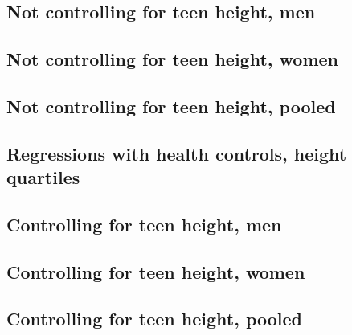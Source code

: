 \documentclass{article}
\begin{document}
\begin{landscape}
\subsection{Not controlling for teen height, men}

\end{landscape}

\begin{landscape}
\subsection{Not controlling for teen height, women}

\end{landscape}

\begin{landscape}
\subsection{Not controlling for teen height, pooled}

\end{landscape}

\begin{landscape}
\section{Regressions with health controls, height quartiles}
\subsection{Controlling for teen height, men}

\end{landscape}

\begin{landscape}
\subsection{Controlling for teen height, women}

\end{landscape}

\begin{landscape}
\subsection{Controlling for teen height, pooled}

\end{landscape}
\end{document}
